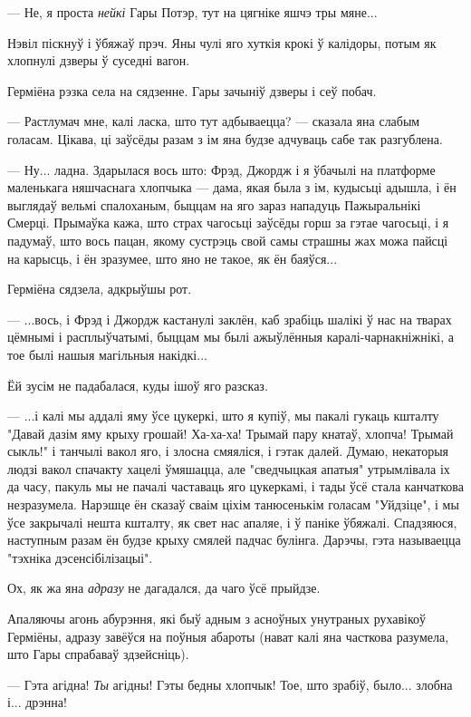--- Не, я проста \emph{нейкі} Гары Потэр, тут на цягніке яшчэ тры мяне...

Нэвіл піскнуў і ўбяжаў прэч. Яны чулі яго хуткія крокі ў калідоры, потым як хлопнулі 
дзверы ў суседні вагон.

Герміёна рэзка села на сядзенне. Гары зачыніў дзверы і сеў побач.

--- Растлумач мне, калі ласка, што тут адбываецца? --- сказала яна слабым голасам.
Цікава, ці заўсёды разам з ім яна будзе адчуваць сабе так разгублена.

--- Ну... ладна. Здарылася вось што: Фрэд, Джордж і я ўбачылі на платформе
маленькага няшчаснага хлопчыка --- дама, якая была з ім, кудысьці адышла,  і ён
выглядаў вельмі спалоханым, быццам на яго зараз нападуць Пажыральнікі Смерці.
Прымаўка кажа, што страх чагосьці заўсёды горш за гэтае чагосьці, і я падумаў,
што вось пацан, якому сустрэць свой самы страшны жах можа пайсці на карысць, 
і ён зразумее, што яно не такое, як ён баяўся...

Герміёна сядзела, адкрыўшы рот. 

--- ...вось, і Фрэд і Джордж кастанулі заклён, каб зрабіць шалікі ў нас на тварах
цёмнымі і расплыўчатымі, быццам мы былі ажыўлённыя каралі-чарнакніжнікі, а тое былі 
нашыя магільныя накідкі...

Ёй зусім не падабалася, куды ішоў яго разсказ.

--- ...і калі мы аддалі яму ўсе цукеркі, што я купіў, мы пакалі гукаць кшталту 
"Давай дазім яму крыху грошай! Ха-ха-ха! Трымай пару кнатаў, хлопча! Трымай сыкль!" 
і танчылі вакол яго, і злосна смяяліся, і гэтак далей. Думаю, некаторыя людзі вакол
спачакту хацелі ўмяшацца, але "сведчыцкая апатыя" утрымлівала іх да часу, пакуль мы
не пачалі частаваць яго цукеркамі, і тады ўсё стала канчаткова незразумела.
Нарэшце ён сказаў сваім ціхім танюсенькім голасам "Уйдзіце", і мы ўсе закрычалі 
нешта кшталту, як свет нас апаляе, і ў паніке ўбяжалі. Спадзяюся, наступным разам
ён будзе крыху смялей падчас булінга. Дарэчы, гэта называецца "тэхніка дэсенсібілізацыі".

Ох, як жа яна  \emph{адразу} не дагадался, да чаго ўсё прыйдзе. 

Апаляючы агонь абурэння, які быў адным з асноўных унутраных рухавікоў Герміёны, 
адразу завёўся на поўныя абароты (нават калі яна часткова разумела, што Гары 
спрабаваў здзейсніць). 

--- Гэта агідна! \emph{Ты} агідны! Гэты бедны хлопчык! Тое, што зрабіў, было... 
злобна і... дрэнна!

